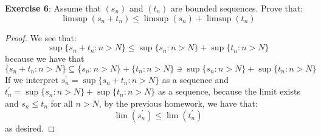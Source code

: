\documentclass{article}
\begin{document}
\textbf{Exercise 6}: Assume that $(s_{n})$ and $(t_{n})$ are bounded sequences. Prove that:
    \begin{equation*}
        \mathop{limsup}(s_{n} + t_{n}) \leq \mathop{limsup}(s_{n}) + \mathop{limsup}(t_{n})
    \end{equation*}
        \begin{proof}
            We see that:
                \begin{equation*}
                    \mathop{sup}\{s_{n} + t_{n}: n > N\} \leq \mathop{sup}\{s_{n} : n > N\} + \mathop{sup}\{t_{n} : n > N\}
                \end{equation*}
            because we have that 
                \begin{equation*}
                    \{s_{n} + t_{n}: n > N\} \subseteq \{s_{n} : n > N\} + \{t_{n} : n > N\} \ni \mathop{sup}\{s_{n} : n > N\} + \mathop{sup}\{t_{n} : n > N\}
                \end{equation*}
            If we interpret $s_{n}^{\prime} = \mathop{sup}\{s_{n} + t_{n}: n > N\}$ as a sequence and  $t^{\prime}_{n} = \mathop{sup}\{s_{n} : n > N\} + \mathop{sup}\{t_{n} : n > N\}$ as a sequence, because the limit exists and $s_{n} \leq t_{n}$ for all $n > N$, by the previous homework, we have that:
                \begin{equation*}
                    \lim(s^{\prime}_{n})\leq \lim(t^{\prime}_{n})
                \end{equation*}
            as desired.
        \end{proof}
\end{document}

